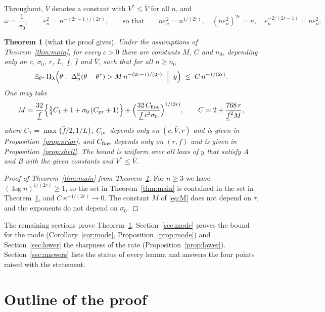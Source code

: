 \documentclass[11pt]{article}
\newtheorem{theorem}{Theorem}
\theoremstyle{definition}
\theoremstyle{remark}
\newcommand{\E}{\mathbb{E}}
\newcommand{\thetas}{\theta^{*}}
\newcommand{\om}{\omega}
\newcommand{\en}{\varepsilon_n}
\newcommand{\fl}{\underline f}
\newcommand{\fu}{\bar f}
\newcommand{\Vb}{\bar V}
\begin{document}
Throughout, $\Vb$ denotes a constant with $V^{*}\le\Vb$ for all $n$, and
\begin{equation}\label{eq:en}
\om=\frac1{\sigma_0},\qquad \en^2=n^{-(2r-1)/(2r)},\qquad\text{so that}\qquad n\en^2=n^{1/(2r)},\quad (n\en^2)^{2r}=n,\quad \en^{-2/(2r-1)}=n\en^2 .
\end{equation}

\begin{theorem}[what the proof gives]\label{thm:sharp}
Under the assumptions of Theorem~\ref{thm:main}, for every $c>0$ there are constants $M$, $C$ and $n_0$, depending only on $c$, $\sigma_0$, $r$, $L$, $\fl$, $\fu$ and $\Vb$, such that for all $n\ge n_0$
\[
\E_{\thetas}\,\Pi_\lambda\Bigl(\theta:\ \Delta_n^2(\theta-\thetas)>M\,n^{-(2r-1)/(2r)}\ \Bigm|\ y\Bigr)\;\le\;C\,n^{-1/(2r)} .
\]
One may take
\begin{equation}\label{eq:M}
M=\frac{32}{\fl}\Bigl\{\tfrac54C_1+1+\sigma_0\,(C_{\rm pr}+1)\Bigr\}+\Bigl(\frac{32\,C_{\rm fine}}{\fl\,c^{2}\sigma_0}\Bigr)^{1/(2r)},
\qquad C=2+\frac{768\,r}{\fl^{2}M},
\end{equation}
where $C_1=\max\{\fu/2,1/L\}$, $C_{\rm pr}$ depends only on $(c,\Vb,r)$ and is given in Proposition~\ref{prop:prior}, and $C_{\rm fine}$ depends only on $(r,\fl)$ and is given in Proposition~\ref{prop:shell}. The bound is uniform over all laws of $y$ that satisfy A and B with the given constants and $V^{*}\le\Vb$.
\end{theorem}

\begin{proof}[Proof of Theorem~\ref{thm:main} from Theorem~\ref{thm:sharp}]
For $n\ge3$ we have $(\log n)^{1/(2r)}\ge1$, so the set in Theorem~\ref{thm:main} is contained in the set in Theorem~\ref{thm:sharp}, and $C\,n^{-1/(2r)}\to0$. The constant $M$ of \eqref{eq:M} does not depend on $\tau$, and the exponents do not depend on $\sigma_0$.
\end{proof}

The remaining sections prove Theorem~\ref{thm:sharp}. Section~\ref{sec:mode} proves the bound for the mode (Corollary~\ref{cor:mode}, Proposition~\ref{prop:mode}) and Section~\ref{sec:lower} the sharpness of the rate (Proposition~\ref{prop:lower}). Section~\ref{sec:answers} lists the status of every lemma and answers the four points raised with the statement.

\section{Outline of the proof}\label{sec:outline}
\end{document}
